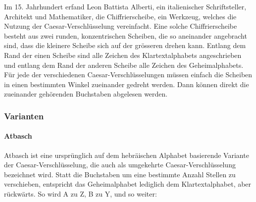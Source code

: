 Im 15. Jahrhundert erfand Leon Battista Alberti, ein italienischer Schriftsteller, Architekt und Mathematiker, die Chiffrierscheibe, ein Werkzeug, welches die Nutzung der Caesar-Verschlüsselung vereinfacht. Eine solche Chiffrierscheibe besteht aus zwei runden, konzentrischen Scheiben, die so aneinander angebracht sind, dass die kleinere Scheibe sich auf der grösseren drehen kann. Entlang dem Rand der einen Scheibe sind alle Zeichen des Klartextalphabets angeschrieben und entlang dem Rand der anderen Scheibe alle Zeichen des Geheimalphabets. Für jede der verschiedenen Caesar-Verschlüsselungen müssen einfach die Scheiben in einen bestimmten Winkel zueinander gedreht werden. Dann können direkt die zueinander gehörenden Buchstaben abgelesen werden.


\subsubsection{Varianten}
\label{sec:c-varianten}

\paragraph{Atbasch}
\label{sec:c-atbasch}
Atbasch ist eine ursprünglich auf dem hebräischen Alphabet basierende Variante der Caesar-Verschlüsselung, die auch als umgekehrte Caesar-Verschlüsselung bezeichnet wird.\cite{wikipedia:atbasch} Statt die Buchstaben um eine bestimmte Anzahl Stellen zu verschieben, entspricht das Geheimalphabet lediglich dem Klartextalphabet, aber rückwärts. So wird A zu Z, B zu Y, und so weiter:

